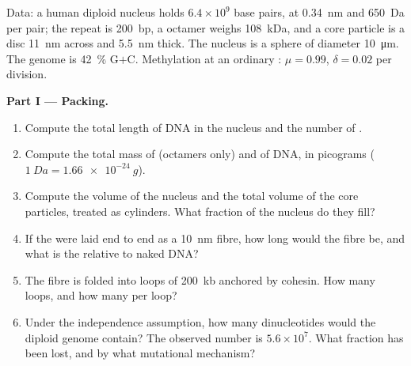 \begin{problem}
\label{pb:b3:chromatin-epigenetics:1}
Data: a human diploid nucleus holds $6.4\times 10^{9}$ base pairs, at
\qty{0.34}{nm} and \qty{650}{Da} per pair; the  repeat is
\qty{200}{bp}, a  octamer weighs \qty{108}{kDa}, and a core
particle is a disc \qty{11}{nm} across and \qty{5.5}{nm} thick. The
nucleus is a sphere of diameter \qty{10}{\micro m}. The genome is
\qty{42}{\%} G$+$C. Methylation at an ordinary : $\mu = 0.99$,
$\delta = 0.02$ per division.

\medskip
\noindent\textbf{Part I --- Packing.}
\begin{enumerate}
  \item Compute the total length of DNA in the nucleus and the number
        of .
  \item Compute the total mass of  (octamers only) and of DNA,
        in picograms ($\qty{1}{Da} = \qty{1.66e-24}{g}$).
  \item Compute the volume of the nucleus and the total volume of the
        core particles, treated as cylinders. What fraction of the
        nucleus do they fill?
  \item If the  were laid end to end as a \qty{10}{nm}
        fibre, how long would the fibre be, and what is the  relative to naked DNA?
  \item The fibre is folded into loops of \qty{200}{kb} anchored by
        cohesin. How many loops, and how many  per loop?
  \item Under the independence assumption, how many  dinucleotides
        would the diploid genome contain? The observed number is
        $5.6\times 10^{7}$. What fraction has been lost, and by what
        mutational mechanism?
\end{enumerate}


\end{problem}
